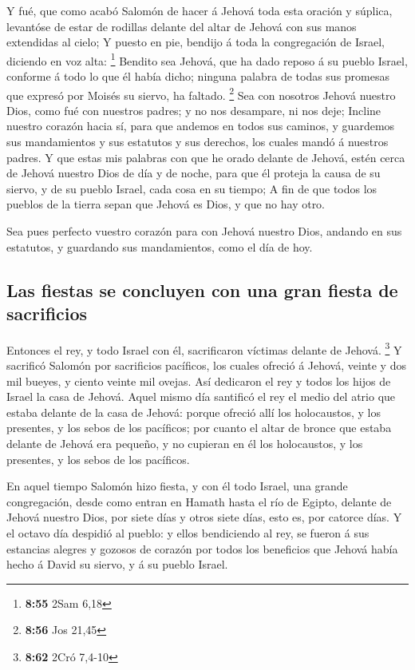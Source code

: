  Y fué, que como acabó Salomón de hacer á Jehová toda esta
oración y súplica, levantóse de estar de rodillas delante del altar de
Jehová con sus manos extendidas al cielo;  Y puesto en pie,
bendijo á toda la congregación de Israel, diciendo en voz alta:
\footnote{\textbf{8:55} 2Sam 6,18}  Bendito sea Jehová, que
ha dado reposo á su pueblo Israel, conforme á todo lo que él había
dicho; ninguna palabra de todas sus promesas que expresó por Moisés su
siervo, ha faltado. \footnote{\textbf{8:56} Jos 21,45}  Sea
con nosotros Jehová nuestro Dios, como fué con nuestros padres; y no nos
desampare, ni nos deje;  Incline nuestro corazón hacia sí,
para que andemos en todos sus caminos, y guardemos sus mandamientos y
sus estatutos y sus derechos, los cuales mandó á nuestros padres.
 Y que estas mis palabras con que he orado delante de
Jehová, estén cerca de Jehová nuestro Dios de día y de noche, para que
él proteja la causa de su siervo, y de su pueblo Israel, cada cosa en su
tiempo;  A fin de que todos los pueblos de la tierra sepan
que Jehová es Dios, y que no hay otro.

 Sea pues perfecto vuestro corazón para con Jehová nuestro
Dios, andando en sus estatutos, y guardando sus mandamientos, como el
día de hoy.

\hypertarget{las-fiestas-se-concluyen-con-una-gran-fiesta-de-sacrificios}{%
\subsection{Las fiestas se concluyen con una gran fiesta de
sacrificios}\label{las-fiestas-se-concluyen-con-una-gran-fiesta-de-sacrificios}}

 Entonces el rey, y todo Israel con él, sacrificaron
víctimas delante de Jehová. \footnote{\textbf{8:62} 2Cró 7,4-10}
 Y sacrificó Salomón por sacrificios pacíficos, los cuales
ofreció á Jehová, veinte y dos mil bueyes, y ciento veinte mil ovejas.
Así dedicaron el rey y todos los hijos de Israel la casa de Jehová.
 Aquel mismo día santificó el rey el medio del atrio que
estaba delante de la casa de Jehová: porque ofreció allí los
holocaustos, y los presentes, y los sebos de los pacíficos; por cuanto
el altar de bronce que estaba delante de Jehová era pequeño, y no
cupieran en él los holocaustos, y los presentes, y los sebos de los
pacíficos.

 En aquel tiempo Salomón hizo fiesta, y con él todo Israel,
una grande congregación, desde como entran en Hamath hasta el río de
Egipto, delante de Jehová nuestro Dios, por siete días y otros siete
días, esto es, por catorce días.  Y el octavo día despidió
al pueblo: y ellos bendiciendo al rey, se fueron á sus estancias alegres
y gozosos de corazón por todos los beneficios que Jehová había hecho á
David su siervo, y á su pueblo Israel.

